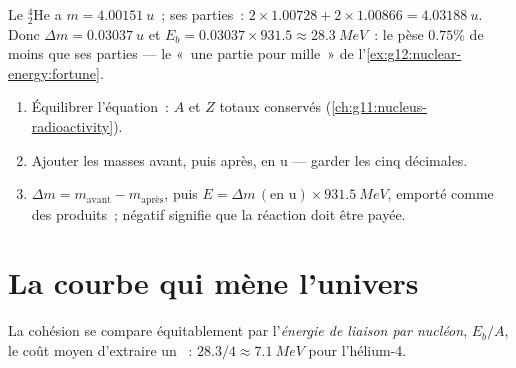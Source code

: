 \begin{example}[Hélium-4]\label{ex:g12:nuclear-energy:helium}
Le  ${}^{4}_{2}\mathrm{He}$ a
$m = \qty{4.00151}{u}$~; ses parties~:
$2 \times 1.00728 + 2 \times 1.00866 = \qty{4.03188}{u}$. Donc
$\Delta m = \qty{0.03037}{u}$ et $E_b = 0.03037 \times 931.5 \approx
\qty{28.3}{MeV}$~: le  pèse $0.75\%$ de
moins que ses parties --- le «~une partie pour mille~» de
l'\cref{ex:g12:nuclear-energy:fortune}.
\end{example}

\begin{method}\label{met:g12:nuclear-energy:balance}
\begin{enumerate}
  \item Équilibrer l'équation~: $A$ et $Z$ totaux conservés
        (\cref{ch:g11:nucleus-radioactivity}).
  \item Ajouter les masses avant, puis après, en \unit{u} --- garder
        les cinq décimales.
  \item $\Delta m = m_{\text{avant}} - m_{\text{après}}$, puis
        $E = \Delta m\,(\text{en u}) \times \qty{931.5}{MeV}$, emporté
        comme  des produits~;
        négatif signifie que la réaction doit être payée.
\end{enumerate}
\end{method}

\section{La courbe qui mène l'univers}

\begin{definition}\label{def:g12:nuclear-energy:pernucleon}
La cohésion se compare équitablement par l'\emph{énergie de liaison
par nucléon}, $E_b/A$, le coût
moyen d'extraire un ~:
$28.3/4 \approx \qty{7.1}{MeV}$ pour l'hélium-4.
\end{definition}

